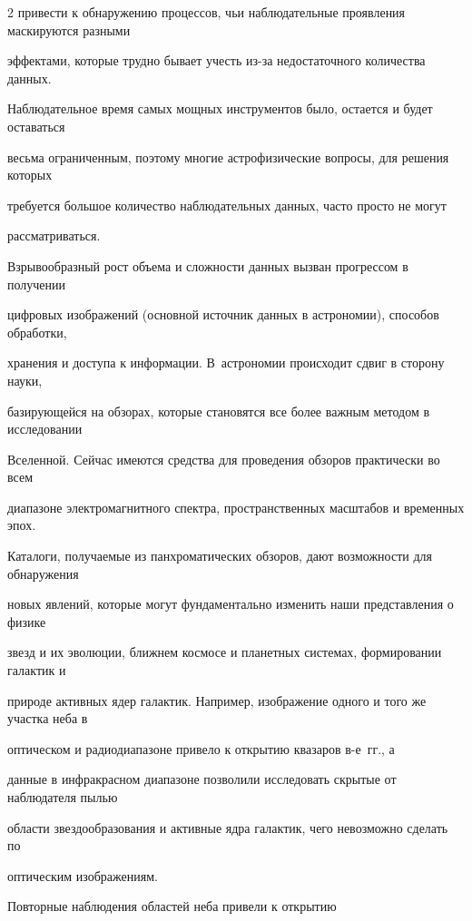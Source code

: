\begin{multicols}{2}
привести к обнаружению процессов, чьи наблюдательные проявления маскируются разными 

эффектами, которые трудно бывает учесть из-за недостаточного количества данных. 

Наблюдательное время самых мощных инструментов было, остается и будет оставаться 

весьма ограниченным, поэтому многие астрофизические вопросы, для решения которых 

требуется большое количество наблюдательных данных, час\-то прос\-то не могут 

рассматриваться. 

      

      Взрывообразный рост объема и сложности данных вызван прогрессом в получении 

цифровых изоб\-ра\-же\-ний (основной источник данных в астрономии), способов обработки, 

хранения и доступа к информации. В~астрономии происходит сдвиг в сторону науки, 

базирующейся на обзорах, которые становятся все более важным методом в исследовании 

Вселенной. Сейчас имеются средства для проведения обзоров практически во всем 

диапазоне электромагнитного спектра, пространственных масштабов и временных эпох. 

Каталоги, по\-лу\-ча\-емые из панхроматических обзоров, дают возможности для обнаружения 

новых явлений, которые могут фундаментально изменить наши представления о физике 

звезд и их эволюции, ближнем космосе и планетных сис\-те\-мах, формировании галактик и 

природе активных ядер галактик. Например, изоб\-ра\-же\-ние одного и того же участка неба в 

оптическом и радиодиапазоне привело к открытию квазаров в-е~гг., а 

данные в инфракрасном диапазоне позволили исследовать скрытые от наблюдателя \mbox{пылью} 

области звездообразования и активные ядра галактик, чего невозможно сделать по 

оптическим изображениям. 



Повторные наблюдения областей неба привели к открытию 


\end{multicols}

